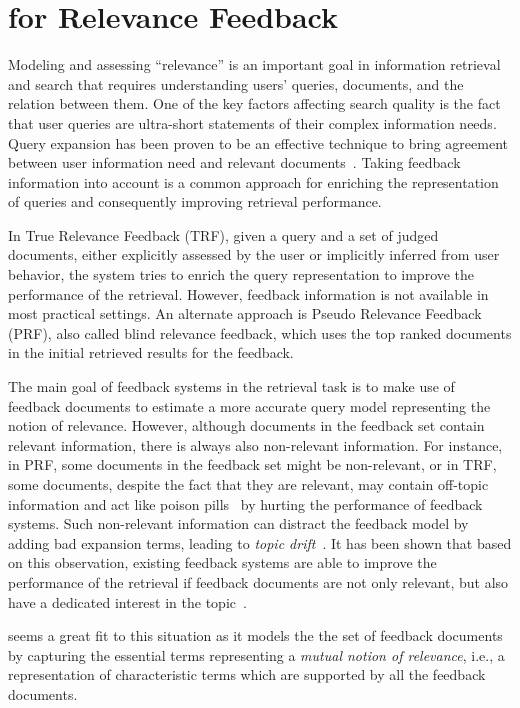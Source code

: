 \section{\acswlm for Relevance Feedback}
Modeling and assessing ``relevance'' is an important goal in information retrieval and search that requires understanding users' queries, documents, and the relation between them.
One of the key factors affecting search quality is the fact that user queries are ultra-short statements of their complex information needs. Query expansion has been proven to be an effective technique to bring agreement between user information need and relevant documents~\citep{Harman:2009}. 
Taking feedback information into account is a common approach for enriching the representation of queries and consequently improving retrieval performance. 

In True Relevance Feedback (TRF), given a query and a set of judged documents, either explicitly assessed by the user or implicitly inferred from user behavior, the system tries to enrich the query representation to improve the performance of the retrieval. However, feedback information is not available in most practical settings. An alternate approach is Pseudo Relevance Feedback (PRF), also called blind relevance feedback, which uses the top ranked documents in the initial retrieved results for the feedback.

The main goal of feedback systems in the retrieval task is to make use of feedback documents to estimate a more accurate query model representing the notion of relevance.
%
However, although documents in the feedback set contain relevant information, there is always also non-relevant information. For instance, in PRF, some documents in the feedback set might be non-relevant, or in TRF, some documents, despite the fact that they are relevant, may contain off-topic information and act like poison pills~\citep{Terra:2005} by hurting the performance of feedback systems.  
Such non-relevant information can distract the feedback model by adding bad expansion terms, leading to \emph{topic drift}~\citep{Macdonald:2007,He:2009:ECIR}.  
It has been shown that based on this observation, existing feedback systems are able to improve the performance of the retrieval if feedback documents are not only relevant, but also have a dedicated interest in the topic~\citep{He:2009:ECIR}.


\emph{\Swlm} seems a great fit to this situation as it models the the set of feedback documents by capturing the essential terms representing a \emph{mutual notion of relevance}, i.e., a representation of characteristic terms which are supported by all the feedback documents.


